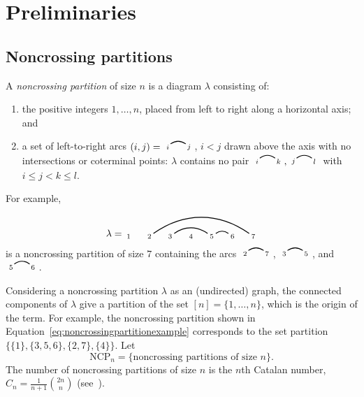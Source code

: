 \documentclass[12pt]{amsart}
\theoremstyle{definition}
\theoremstyle{remark}
\numberwithin{equation}{section}
\newcommand{\NCP}{\mathrm{NCP}}
\newcommand{\edge}[2]{\tikz[scale = 0.75, baseline = -0.2cm]{
\draw (0.1, 0) node[inner sep = 0ex] (a) {};
\node[left, xshift = 0.1cm, yshift = -0.1cm] at (a) {$\scriptstyle #1$};
\draw (0.9, 0)  node[inner sep = 0ex] (b) {};
\node[right, xshift = -0.1cm, yshift = -0.1cm] at (b) {$\scriptstyle #2$};
\draw[thick] (a) to[out = 35, in = 145] (b);}}
\begin{document}
\section{Preliminaries}

\subsection{Noncrossing partitions}
\label{sec:ncp}


A \emph{noncrossing partition} of size $n$ is a diagram $\lambda$ consisting of:
\begin{enumerate}
\item the positive integers $1, \ldots, n$, placed from left to right along a horizontal axis; and

\item a set of left-to-right arcs $ (i, j) = \edge{i}{j}$, $i < j$ drawn above the axis with no intersections or coterminal points: $\lambda$ contains no pair $\edge{i}{k}, \edge{j}{l}$ with $i \le j < k \le l$.

\end{enumerate}
For example,
\begin{equation}
\label{eq:noncrossingpartitionexample}
\lambda = \begin{tikzpicture}[scale = 0.75, baseline = 0.75*-0.2]
\foreach \x in {1, ..., 7}{\draw[fill] (\x - 1, 0) node[inner sep = 2pt] (\x) {$\scriptstyle \x$};}
\foreach \i\j in {5/6, 3/5,2/7}{\draw[thick] (\i) to[out = 35, in = 145] (\j);}
\end{tikzpicture}
\end{equation}
is a noncrossing partition of size $7$ containing the arcs $\edge{2}{7}$, $\edge{3}{5}$, and $\edge{5}{6}$.

Considering a noncrossing partition $\lambda$ as an (undirected) graph, the connected components of $\lambda$ give a partition of the set $[n] = \{1, \ldots, n\}$, which is the origin of the term.  For example, the noncrossing partition shown in Equation~\eqref{eq:noncrossingpartitionexample} corresponds to the set partition $\{ \{1\}, \{3, 5, 6\}, \{2, 7\}, \{4\}  \}$.  Let
\[
\NCP_{n} = \{ \text{noncrossing partitions of size $n$} \}.
\]
The number of noncrossing partitions of size $n$ is the $n$th Catalan number, $C_{n} = \frac{1}{n+1}\binom{2n}{n}$ (see~\cite{Stanley}).
\end{document}
